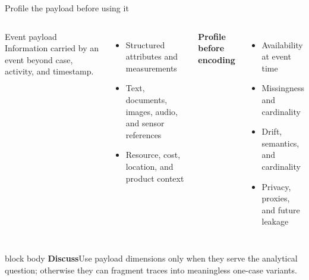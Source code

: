 \documentclass[aspectratio=169,11pt]{beamer}
\newcommand{\promptbox}[1]{%
  \begin{beamercolorbox}[rounded=true,sep=0.65em]{block body}
    \textbf{\color{Coral}Discuss}\quad #1
  \end{beamercolorbox}
}
\begin{document}
\begin{frame}{Profile the payload before using it}
  \small
  \begin{columns}[T,onlytextwidth]
      \begin{block}{Event payload}
        Information carried by an event beyond case, activity, and timestamp.
      \end{block}
      \begin{itemize}
        \item Structured attributes and measurements
        \item Text, documents, images, audio, and sensor references
        \item Resource, cost, location, and product context
      \end{itemize}
      \textbf{Profile before encoding}
      \begin{itemize}
        \item Availability at event time
        \item Missingness and cardinality
        \item Drift, semantics, and cardinality
        \item Privacy, proxies, and future leakage
      \end{itemize}
  \end{columns}
  \vspace{0.05cm}
  \promptbox{Use payload dimensions only when they serve the analytical question;
  otherwise they can fragment traces into meaningless one-case variants.}
\end{frame}
\end{document}
